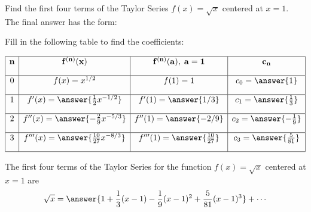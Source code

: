 \documentclass{ximera}
\begin{document}
\begin{problem} Find the first four terms of the Taylor Series $f(x) = \sqrt x$ centered at $x = 1$.\\

The final answer has the form:
\begin{center}
\begin{multipleChoice}
\end{multipleChoice}
\end{center}

Fill in the following table to find the coefficients:

\[
\begin{array}{|c|c|c|c|} 
\hline
\bf{n} & \bf{f^{(n)}(x)} & \bf{f^{(n)}(a),\; a = 1} & \bf{c_n} \\[1em] 
\hline
 0 & f(x) = x^{1/2} & f(1) = 1 & c_0 = \answer{1} \\[1em]
\hline
1 & f'(x) = \answer{\frac12 x^{-1/2}} & f'(1) = \answer{1/3} & c_1 = \answer{\frac13} \\[1em]
\hline
 2 & f''(x) =\answer{-\frac29 x^{-5/3}} & f''(1) = \answer{-2/9} & c_2 = \answer{-\frac{1}{9}} \\[1em]
\hline
 3 & f'''(x) =\answer{\frac{10}{27} x^{-8/3}} & f'''(1) = \answer{\frac{10}{27} } & c_3 = \answer{\frac{5}{81}}\\[1em]
\hline
\end{array}
\]


The first four terms of the Taylor Series for the function $f(x) = \sqrt x$ centered at $x = 1$ are
\[
\sqrt x = \answer{1 + \frac13(x-1) -\frac{1}{9}(x-1)^2 + \frac{5}{81}(x-1)^3} + \cdots
\]


\end{problem}
\end{document}
